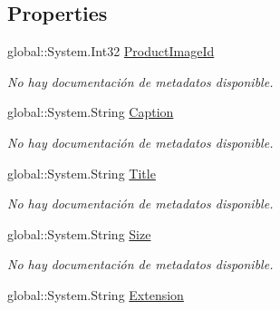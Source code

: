 \subsection*{Properties}
\begin{DoxyCompactItemize}
\item 
global\-::\-System.\-Int32 \hyperlink{class_microsoft_1_1_samples_1_1_kinect_1_1_basic_interactions_1_1_product_images_a3c3eebd7b5e733cdd0fcc6374ef66e54}{Product\-Image\-Id}
\begin{DoxyCompactList}\small\item\em No hay documentación de metadatos disponible. \end{DoxyCompactList}\item 
global\-::\-System.\-String \hyperlink{class_microsoft_1_1_samples_1_1_kinect_1_1_basic_interactions_1_1_product_images_a57c9be1b32a5d6b9e81f574f39e2da30}{Caption}
\begin{DoxyCompactList}\small\item\em No hay documentación de metadatos disponible. \end{DoxyCompactList}\item 
global\-::\-System.\-String \hyperlink{class_microsoft_1_1_samples_1_1_kinect_1_1_basic_interactions_1_1_product_images_aa49dd0c143020189b073750c3374a9dc}{Title}
\begin{DoxyCompactList}\small\item\em No hay documentación de metadatos disponible. \end{DoxyCompactList}\item 
global\-::\-System.\-String \hyperlink{class_microsoft_1_1_samples_1_1_kinect_1_1_basic_interactions_1_1_product_images_a4f97ce75e8cfce389fd2bda791e24519}{Size}
\begin{DoxyCompactList}\small\item\em No hay documentación de metadatos disponible. \end{DoxyCompactList}\item 
global\-::\-System.\-String \hyperlink{class_microsoft_1_1_samples_1_1_kinect_1_1_basic_interactions_1_1_product_images_aeb2144fc2add6d286d25b0b75f541dac}{Extension}

\end{DoxyCompactItemize}
